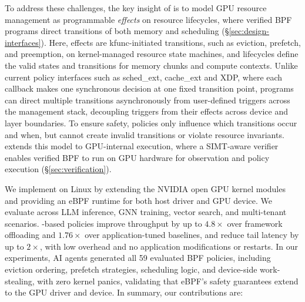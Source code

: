 To address these challenges, the key insight of \sys{} is to model GPU resource management as programmable \emph{effects} on resource lifecycles, where verified BPF programs direct transitions of both memory and scheduling (\S\ref{sec:design-interfaces}). Here, effects are kfunc-initiated transitions, such as eviction, prefetch, and preemption, on kernel-managed resource state machines, and lifecycles define the valid states and transitions for memory chunks and compute contexts. Unlike current policy interfaces such as sched\_ext, cache\_ext and XDP, where each callback makes one synchronous decision at one fixed transition point, \sys{} programs can direct multiple transitions asynchronously from user-defined triggers across the management stack, decoupling triggers from their effects across device and layer boundaries. To ensure safety, policies only influence which transitions occur and when, but cannot create invalid transitions or violate resource invariants. \sys{} extends this model to GPU-internal execution, where a SIMT-aware verifier enables verified BPF to run on GPU hardware for observation and policy execution (\S\ref{sec:verification}). 

We implement \sys{} on Linux by extending the NVIDIA open GPU kernel modules~\cite{nvidia-open-gpu} and providing an eBPF runtime for both host driver and GPU device. We evaluate \sys{} across LLM inference, GNN training, vector search, and multi-tenant scenarios. \sys-based policies improve throughput by up to $4.8\times$ over framework offloading and $1.76\times$ over application-tuned baselines, and reduce tail latency by up to $2\times$, with low overhead and no application modifications or restarts.
In our experiments, AI agents generated all 59 evaluated BPF policies, including eviction ordering, prefetch strategies, scheduling logic, and device-side work-stealing, with zero kernel panics, validating that eBPF's safety guarantees extend to the GPU driver and device. In summary, our contributions are:

